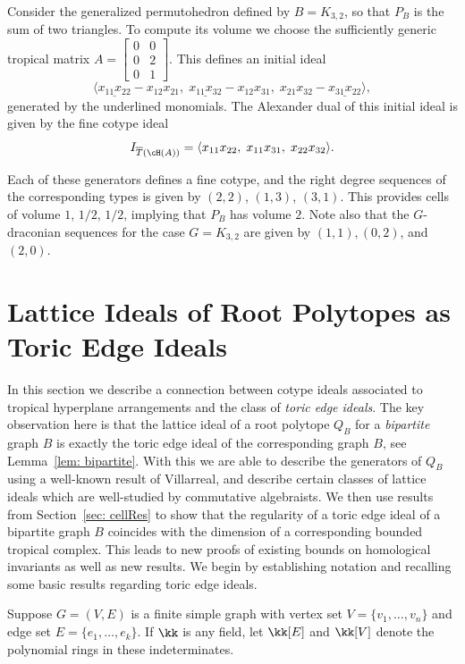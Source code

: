 \begin{example}
Consider the generalized permutohedron defined by $B = K_{3,2}$, so that $P_B$ is the sum of two triangles.  To compute its volume we choose the sufficiently generic tropical matrix $A = \begin{bmatrix} 0 & 0 \\ 0 & 2 \\ 0 & 1 \end{bmatrix}$.  This defines an initial ideal
\[\langle \underline{x_{11}x_{22}} - x_{12}x_{21}, \; \underline{x_{11}x_{32}} - x_{12}x_{31}, \; x_{21}x_{32} - \underline{x_{31}x_{22}} \rangle,\]
\noindent
generated by the underlined monomials. The Alexander dual of this initial ideal is given by the fine cotype ideal
\[I_{\overline{T}(\cH(A))} = \langle x_{11}x_{22}, \; x_{11}x_{31}, \; x_{22}x_{32} \rangle.\]

Each of these generators defines a fine cotype, and the right degree sequences of the corresponding types is given by $(2,2)$, $(1,3)$, $(3,1)$.  This provides cells of volume $1$, $1/2$, $1/2$, implying that $P_B$ has volume $2$.  Note also that the $G$-draconian sequences for the case $G=K_{3,2}$ are given by $(1,1), (0,2)$, and $(2,0)$.
\end{example}

\section{Lattice Ideals of Root Polytopes as Toric Edge Ideals}\label{sec: lattice}

In this section we describe a connection between cotype ideals associated to tropical hyperplane arrangements and the class of \emph{toric edge ideals}.  The key observation here is that the lattice ideal of a root polytope $Q_B$ for a \emph{bipartite} graph $B$ is exactly the toric edge ideal of the corresponding graph $B$, see Lemma~\ref{lem: bipartite}. With this we are able to describe the generators of $Q_B$ using a well-known result of Villarreal, and describe certain classes of lattice ideals which are well-studied by commutative algebraists. We then use results from Section~\ref{sec: cellRes} to show that the regularity of a toric edge ideal of a bipartite graph $B$ coincides with the dimension of a corresponding bounded tropical complex.  This leads to new proofs of existing bounds on homological invariants as well as new results. We begin by establishing notation and recalling some basic results regarding toric edge ideals.
\begin{notation}
Suppose $G = (V,E)$ is a finite simple graph with vertex set $V = \{v_1, \dots, v_n\}$ and edge set $E = \{e_1, \dots, e_k\}$. If $\kk$ is any field, let $\kk[E]$ and $\kk[V]$ denote the polynomial rings in these indeterminates. 
\end{notation}

